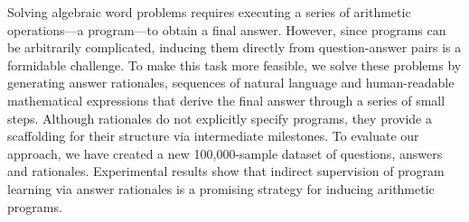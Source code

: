 Solving algebraic word problems requires executing a series of arithmetic operations---a program---to obtain a final answer. However, since programs can be arbitrarily complicated, inducing them directly from question-answer pairs is a formidable challenge. To make this task more feasible, we solve these problems by generating answer rationales, sequences of natural language and human-readable mathematical expressions that derive the final answer through a series of small steps. Although rationales do not explicitly specify programs, they provide a scaffolding for their structure via intermediate milestones. To evaluate our approach, we have created a new 100,000-sample dataset of questions, answers and rationales. Experimental results show that indirect supervision of program learning via answer rationales is a promising strategy for inducing arithmetic programs.
